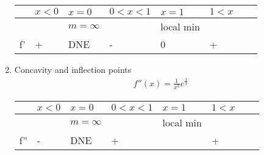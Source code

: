 \documentclass{article}
\theoremstyle{mytheoremstyle}
\theoremstyle{mytheoremstyle}
\theoremstyle{myproblemstyle}
\begin{document}
\begin{enumerate}
            \begin{center}
                \begin{tabular}[c]{l|l|l|l|l|l|l|l}
                    \hline
                    & $x<0$ & $x=0$ & $0<x<1$ & $x=1$ & $1<x$\\
                    \hline
                    && $m=\infty$ && local min &\\
                    f' & + & DNE & - & 0 & + \\
                    \hline
                \end{tabular}
            \end{center}

        \item Concavity and inflection points
            \begin{align*}
                f''(x) = \frac{1}{x^3} e^{\frac{1}{x}}
            \end{align*}

            \begin{center}
                \begin{tabular}[c]{l|l|l|l|l|l|l|l}
                    \hline
                    & $x<0$ & $x=0$ & $0<x<1$ & $x=1$ & $1<x$\\
                    \hline
                    && $m=\infty$ && local min & \\
                    f'' & - & DNE & + &  & + \\
                    \hline
                \end{tabular}
            \end{center}
    \end{enumerate}

\end{document}
